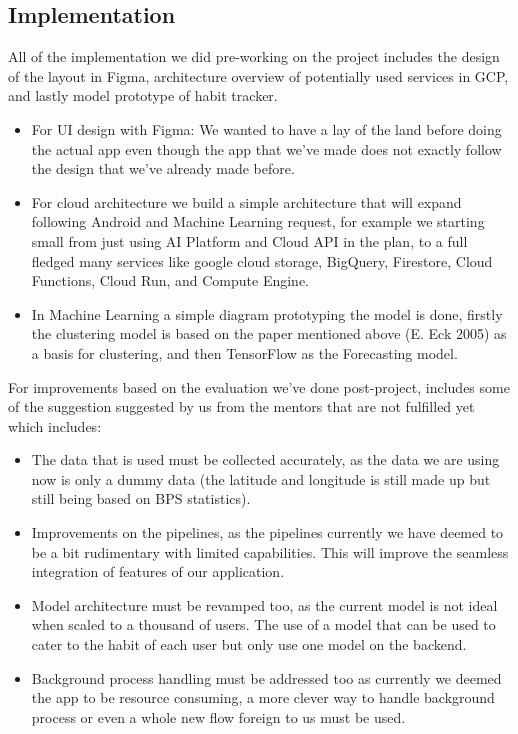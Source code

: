 {\subsection*{Implementation}
All of the implementation we did pre-working on the project includes the design of the layout in Figma, architecture overview of potentially used services in GCP, and lastly model prototype of habit tracker.
\begin{itemize}
    \item For UI design with Figma: We wanted to have a lay of the land before doing the actual app even though the app that we’ve made does not exactly follow the design that we’ve already made before.
    \item For cloud architecture we build a simple architecture that will expand following Android and Machine Learning request, for example we starting small from just  using AI Platform and Cloud API in the plan, to a full fledged many services like google cloud storage, BigQuery, Firestore, Cloud Functions, Cloud Run, and Compute Engine.
    \item In Machine Learning a simple diagram prototyping the model is done, firstly the clustering model is based on the paper mentioned above (E. Eck 2005) as a basis for clustering, and then TensorFlow as the Forecasting model.
\end{itemize}

For improvements based on the evaluation we’ve done post-project, includes some of the suggestion suggested by us from the mentors that are not fulfilled yet which includes:
\begin{itemize}
    \item The data that is used must be collected accurately, as the data we are using now is only a dummy data (the latitude and longitude is still made up but still being based on BPS statistics).
    \item Improvements on the pipelines, as the pipelines currently we have deemed to be a bit rudimentary with limited capabilities. This will improve the seamless integration of features of our application.
    \item Model architecture must be revamped too, as the current model is not ideal when scaled to a thousand of users. The use of a model that can be used to cater to the habit of each user but only use one model on the backend.
    \item Background process handling must be addressed too as currently we deemed the app to be resource consuming, a more clever way to handle background process or even a whole new flow foreign to us must be used.
\end{itemize}
}

